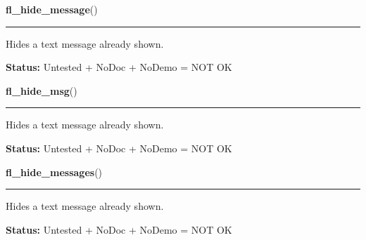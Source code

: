     \label{xformslib:flgoodies:fl_hide_message}

    \vspace{0.5ex}

\hspace{.8\funcindent}\begin{boxedminipage}{\funcwidth}

    \raggedright \textbf{fl\_hide\_message}()

    \vspace{-1.5ex}

    \rule{\textwidth}{0.5\fboxrule}
\setlength{\parskip}{2ex}
    Hides a text message already shown.

\setlength{\parskip}{1ex}
\textbf{Status:} Untested + NoDoc + NoDemo = NOT OK



    \end{boxedminipage}

    \label{xformslib:flgoodies:fl_hide_message}

    \vspace{0.5ex}

\hspace{.8\funcindent}\begin{boxedminipage}{\funcwidth}

    \raggedright \textbf{fl\_hide\_msg}()

    \vspace{-1.5ex}

    \rule{\textwidth}{0.5\fboxrule}
\setlength{\parskip}{2ex}
    Hides a text message already shown.

\setlength{\parskip}{1ex}
\textbf{Status:} Untested + NoDoc + NoDemo = NOT OK



    \end{boxedminipage}

    \label{xformslib:flgoodies:fl_hide_message}

    \vspace{0.5ex}

\hspace{.8\funcindent}\begin{boxedminipage}{\funcwidth}

    \raggedright \textbf{fl\_hide\_messages}()

    \vspace{-1.5ex}

    \rule{\textwidth}{0.5\fboxrule}
\setlength{\parskip}{2ex}
    Hides a text message already shown.

\setlength{\parskip}{1ex}
\textbf{Status:} Untested + NoDoc + NoDemo = NOT OK



    \end{boxedminipage}

